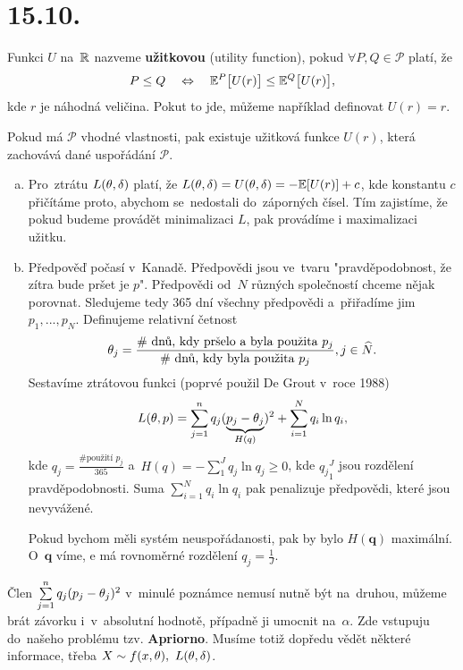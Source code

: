 \section{15.10.}
\begin{define}
	Funkci $U$ na~$\mathbb{R}$ nazveme \textbf{užitkovou} (utility function), pokud $\forall P,Q\in\mathcal{P}$ platí, že 
	$$ P\leq Q\quad\Leftrightarrow\quad\mathbb{E}^P\big[U(r)\big]\leq\mathbb{E}^Q\big[U(r)\big],$$ kde $r$ je náhodná veličina. Pokut to jde, můžeme například definovat $U(r)=r$.
\end{define}
\begin{remark}
	Pokud má $\mathcal{P}$ vhodné vlastnosti, pak existuje užitková funkce $U(r)$, která zachovává dané uspořádání $\mathcal{P}$. 
\end{remark}
\begin{remark}
	\begin{enumerate}[a)]
		\item Pro~ztrátu $L(\theta,\delta)$ platí, že $L(\theta,\delta)=U(\theta,\delta)=-\mathbb{E}[U(r)]+c$, kde konstantu $c$ přičítáme proto, abychom se~nedostali do~záporných čísel. Tím zajistíme, že pokud budeme provádět minimalizaci $L$, pak provádíme i maximalizaci užitku.
		\item Předpověď počasí v~Kanadě. Předpovědi jsou ve~tvaru "pravděpodobnost, že zítra bude pršet je $p$". Předpovědi od~$N$ různých společností chceme nějak porovnat. Sledujeme tedy 365 dní všechny předpovědi a~přiřadíme jim $p_1,...,p_N$. Definujeme relativní četnost $$\theta_j=\frac{\text{\# dnů, kdy pršelo a~byla použita }p_j}{\text{\# dnů, kdy byla použita }p_j},j\in\widehat{N}.$$ Sestavíme ztrátovou funkci (poprvé použil De Grout v~roce 1988) $$L(\theta,p)=\sum\limits_{j=1}^{n} q_j(\underbrace{p_j-\theta_j}_{H(q)})^2+\sum_{i=1}^N q_i\ln q_i,$$ kde $q_j=\frac{\text{\# použití }p_j}{365}$ a~$H(q)=-\sum_1^J q_j\ln q_j\geq 0$, kde ${q_j}_1^J$ jsou rozdělení pravděpodobnosti. Suma $\sum_{i=1}^N q_i\ln q_i$ pak penalizuje předpovědi, které jsou nevyvážené.
		
		Pokud bychom měli systém neuspořádanosti, pak by bylo $H(\textbf{q})$ maximální. O~$\textbf{q}$ víme, e má rovnoměrné rozdělení $q_j=\frac{1}{J}$.
	\end{enumerate}
\end{remark}
\begin{remark}
	Člen $\sum\limits_{j=1}^{n} q_j(p_j-\theta_j)^2$ v~minulé poznámce nemusí nutně být na~druhou, můžeme brát závorku i~v~absolutní hodnotě, případně ji umocnit na~$\alpha$. Zde vstupuju do~našeho problému tzv. \textbf{Apriorno}. Musíme totiž dopředu vědět některé informace, třeba $X\sim f(x,\theta),~L(\theta,\delta)$.
\end{remark}
